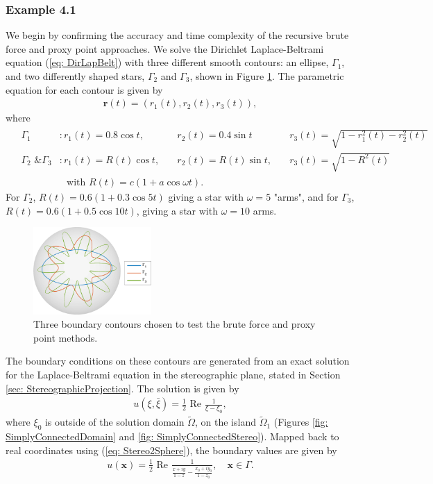 \documentclass{sfuthesis}
\begin{document}
\subsubsection{Example 4.1}
We begin by confirming the accuracy and time complexity of the recursive brute force and proxy point approaches. We solve the Dirichlet Laplace-Beltrami equation (\ref{eq: DirLapBelt}) 
with three different smooth contours: an ellipse, $\Gamma_1$,  and two differently shaped stars, $\Gamma_2$ and $\Gamma_3$, shown in Figure \ref{fig: Ex4-1Domains}. The parametric equation for each contour is given by
\begin{align*}
	\mathbf{r}(t)=(r_1(t), r_2(t), r_3(t)),
\end{align*}
where 
\begin{align*}
	&\begin{array}{llll}
	\Gamma_1 &: r_1(t)=0.8 \cos t , \quad  &r_2(t)=0.4 \sin t \quad &r_3(t)=\sqrt{1-r_1^2(t)-r_2^2(t)}\\
	\Gamma_2 \text{ \& } \Gamma_3 &: r_1(t)=R(t) \cos t, \quad &r_2(t)=R(t) \sin t , \quad &r_3(t)=\sqrt{1-R^2(t)}
	\end{array}\\
	& \hspace{2cm} \text{ with } R(t)=c(1+a \cos \omega t).
\end{align*}
For $\Gamma_2$, $R(t)=0.6(1+0.3 \cos 5t )$ giving a star with $\omega=5$ "arms", and for $\Gamma_3$, $R(t)=0.6(1+0.5 \cos 10t)$, giving a star with $\omega=10$ arms. 
\begin{figure}[h]
	\centering
	\includegraphics[width=0.4\textwidth]{Ex4-1Domains}
	\caption{Three boundary contours chosen to test the brute force and proxy point methods. }
	\label{fig: Ex4-1Domains}
\end{figure} 

The boundary conditions on these contours are generated from an exact solution for the Laplace-Beltrami equation in the stereographic plane, stated in Section \ref{sec: StereographicProjection}. The solution is given by 
\begin{align*}
	u(\xi, \bar{\xi})=\frac{1}{2} \text{ Re } \frac{1}{\xi -\xi_0},
\end{align*}
where $\xi_0$ is outside of the solution domain $\tilde{\Omega}$, on the island $\tilde{\Omega}_1$ (Figures \ref{fig: SimplyConnectedDomain} and \ref{fig: SimplyConnectedStereo}).
Mapped back to real coordinates using (\ref{eq: Stereo2Sphere}), the boundary values are given by 
\begin{align}
	u(\mathbf{x})= \frac{1}{2} \text{ Re } \frac{1}{{\displaystyle \frac{x+iy}{1-z} - \frac{x_0+iy_0}{1-z_0}}}, \quad \mathbf{x}\in \Gamma. \label{eq: Ch4RefSoln}
\end{align}
\end{document}
